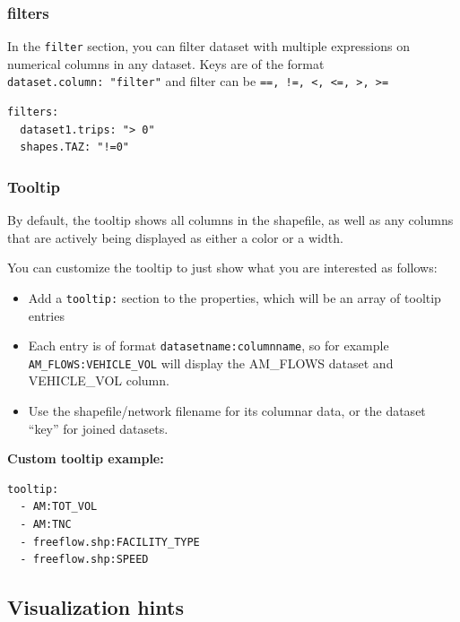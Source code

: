 \hypertarget{filters}{%
\subsubsection{filters}\label{filters}}

In the \texttt{filter} section, you can filter dataset with multiple
expressions on numerical columns in any dataset. Keys are of the format
\texttt{dataset.column:\ "filter"} and filter can be
\texttt{==,\ !=,\ \textless{},\ \textless{}=,\ \textgreater{},\ \textgreater{}=}

\begin{lstlisting}
filters:
  dataset1.trips: "> 0"
  shapes.TAZ: "!=0"

\end{lstlisting}

\hypertarget{tooltip}{%
\subsubsection{Tooltip}\label{tooltip}}

By default, the tooltip shows all columns in the shapefile, as well as
any columns that are actively being displayed as either a color or a
width.

You can customize the tooltip to just show what you are interested as
follows:

\begin{itemize}
\tightlist
\item
  Add a \texttt{tooltip:} section to the properties, which will be an
  array of tooltip entries
\item
  Each entry is of format \texttt{datasetname:columnname}, so for
  example \texttt{AM\_FLOWS:VEHICLE\_VOL} will display the AM\_FLOWS
  dataset and VEHICLE\_VOL column.
\item
  Use the shapefile/network filename for its columnar data, or the
  dataset ``key'' for joined datasets.
\end{itemize}

\textbf{Custom tooltip example:}

\begin{lstlisting}
tooltip:
  - AM:TOT_VOL
  - AM:TNC
  - freeflow.shp:FACILITY_TYPE
  - freeflow.shp:SPEED
\end{lstlisting}

\hypertarget{visualization-hints}{%
\subsection{Visualization hints}\label{visualization-hints}}

